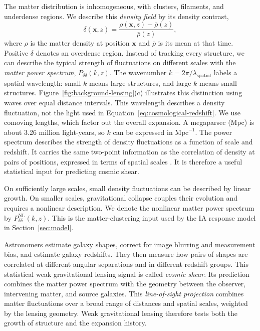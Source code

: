 The matter distribution is inhomogeneous, with clusters, filaments, and
underdense regions. We describe this \emph{density field} by its
density contrast,
\begin{equation}
  \delta(\boldsymbol{x},z)=
  \frac{\rho(\boldsymbol{x},z)-\bar\rho(z)}{\bar\rho(z)},
  \label{eq:matter-density-contrast}
\end{equation}
where $\rho$ is the matter density at position $\boldsymbol{x}$ and
$\bar\rho$ is its mean at that time. Positive $\delta$ denotes an overdense
region. Instead of tracking every structure, we can describe the typical
strength of fluctuations on different scales with the \emph{matter power
spectrum}, $P_{\delta\delta}(k,z)$. The wavenumber
$k=2\pi/\lambda_{\mathrm{spatial}}$ labels a spatial wavelength: small $k$
means large structures, and large $k$ means small structures.
Figure~\ref{fig:background-lensing}(c) illustrates this distinction using
waves over equal distance intervals. This wavelength describes a density fluctuation,
not the light used in Equation~\eqref{eq:cosmological-redshift}.
We use comoving lengths, which factor out the overall expansion. A
megaparsec (Mpc) is about 3.26 million light-years, so $k$ can be expressed
in $\mathrm{Mpc}^{-1}$. The power spectrum describes the strength of density
fluctuations as a function of scale and redshift. It carries the same
two-point information as the correlation of density at pairs of positions,
expressed in terms of spatial scales \citep{2001PhR...340..291B}. It is
therefore a useful statistical input for predicting cosmic shear.

On sufficiently large scales, small density fluctuations can be described
by linear growth. On smaller scales, gravitational collapse couples their
evolution and requires a nonlinear description. We denote the nonlinear
matter power spectrum by $P_{\delta\delta}^{\mathrm{NL}}(k,z)$.
This is the matter-clustering input used by the IA response model in
Section~\ref{sec:model}.

Astronomers estimate galaxy shapes, correct for image blurring and measurement
bias, and estimate galaxy redshifts. They then measure how pairs of shapes
are correlated at different angular separations and in different redshift
groups. This statistical weak gravitational lensing signal is called
\emph{cosmic shear}. Its prediction combines the matter power spectrum with
the geometry between the observer, intervening matter, and source galaxies.
This \emph{line-of-sight projection} combines matter fluctuations over a
broad range of distances and spatial scales, weighted by the lensing
geometry. Weak gravitational lensing therefore tests both the growth of
structure and the expansion history.

